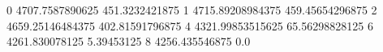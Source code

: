 0 4707.7587890625 451.3232421875
1 4715.89208984375 459.45654296875
2 4659.25146484375 402.81591796875
4 4321.99853515625 65.56298828125
6 4261.830078125 5.39453125
8 4256.435546875 0.0
